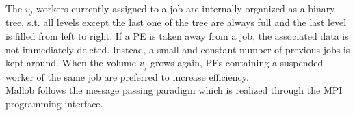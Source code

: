 The $v_j$ workers currently assigned to a job are internally organized as a binary tree, s.t. all levels except the last one of the tree are always full and the last level is filled from left to right. If a PE is taken away from a job, the associated data is not immediately deleted. Instead, a small and constant number of previous jobs is kept around. When the volume $v_j$ grows again, PEs containing a suspended worker of the same job are preferred to increase efficiency. \\
Mallob follows the message passing paradigm which is realized through the MPI programming interface.

\begin{comment}
all from \cite{schreiber2021scalable}
- Mallob - \textbf{Ma}lleable \textbf{Lo}ad \textbf{B}alancer or \textbf{M}ulti-tasking \textbf{A}gi\textbf{l}e \textbf{Lo}gic \textbf{B}lackbox
- Mallob contains a parallel SAT solver
- scales up to 2000 cores
- is able to solve multiple instances in parallel, adjusting resources per job on a dynamic basis
- is a decentralized malleable job scheduler
- there is no shared RAM, communication via message passing
- jobs $j$ can arrive at arbitrary times
- for SAT: a logic formula in Conjunctive Normal Form (CNF)
- each job $j$ has a constant priority $pi_j \in (0, 1)$
- each job $j$ has a variable (over time) resource demand $d_j \in \mathcal{N}$
- simple case: $d_j$ is the number of available PEs
- $d_j$ allows a job how many resources it is able to utilize at most
- Mallob expects the number of active jobs to be lower than the number of workers, i.e. that $d_j > 1$
- each PE works on only one job at a time
- the first PE assigned to a job $j$ is its root and is fixed over the lifetime of the job
- the volume of a job is proportional to $d_j p_j / \sum_{j'} d_{j'} p_{j'}$
- PEs of a job are arranged as a binary tree which is complete except for potentially the lowest layer (nodes from the right of the last layer may be missing)
- new nodes in a job are preferably taken from the list of suspended nodes of this job

now from \cite{sanders2022decentralized}
- focus on (NP-)hard jobs with unknown processing time
- the job itself can be small while still being hard

according to \cite{feitelson1997job}
- Mallob is the class of Malleable load balancer that tells the user when PEs may be taken away (on suspend!)
- this increases complexity, but also allows us to react to such events
\end{comment}
